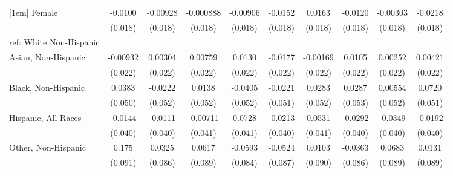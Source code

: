 \begin{table}[htbp]
\begin{tabular}{l*{9}{c}}
[1em]
Female&     -0.0100         &    -0.00928         &   -0.000888         &    -0.00906         &     -0.0152         &      0.0163         &     -0.0120         &    -0.00303         &     -0.0218         \\
  &     (0.018)         &     (0.018)         &     (0.018)         &     (0.018)         &     (0.018)         &     (0.018)         &     (0.018)         &     (0.018)         &     (0.018)         \\
[1em]
ref: White Non-Hispanic&                     &                     &                     &                     &                     &                     &                     &                     &                     \\
[1em]
Asian, Non-Hispanic&    -0.00932         &     0.00304         &     0.00759         &      0.0130         &     -0.0177         &    -0.00169         &      0.0105         &     0.00252         &     0.00421         \\
  &     (0.022)         &     (0.022)         &     (0.022)         &     (0.022)         &     (0.022)         &     (0.022)         &     (0.022)         &     (0.022)         &     (0.022)         \\
[1em]
Black, Non-Hispanic&      0.0383         &     -0.0222         &      0.0138         &     -0.0405         &     -0.0221         &      0.0283         &      0.0287         &     0.00554         &      0.0720         \\
  &     (0.050)         &     (0.052)         &     (0.052)         &     (0.052)         &     (0.051)         &     (0.052)         &     (0.053)         &     (0.052)         &     (0.051)         \\
[1em]
Hispanic, All Races&     -0.0144         &     -0.0111         &    -0.00711         &      0.0728\sym{*}  &     -0.0213         &      0.0531         &     -0.0292         &     -0.0349         &     -0.0192         \\
  &     (0.040)         &     (0.040)         &     (0.041)         &     (0.041)         &     (0.040)         &     (0.041)         &     (0.040)         &     (0.040)         &     (0.040)         \\
[1em]
Other, Non-Hispanic&       0.175\sym{*}  &      0.0325         &      0.0617         &     -0.0593         &     -0.0524         &      0.0103         &     -0.0363         &      0.0683         &      0.0131         \\
  &     (0.091)         &     (0.086)         &     (0.089)         &     (0.084)         &     (0.087)         &     (0.090)         &     (0.086)         &     (0.089)         &     (0.089)         \\

\end{tabular}
\end{table}
